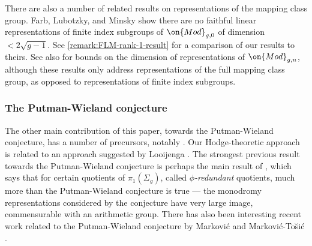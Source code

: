 There are also a number of related results on representations of the mapping class group.
Farb, Lubotzky, and Minsky \cite[Theorem 1.6]{farbLM:rank-1-phenomena} show there are no faithful linear
representations of finite index subgroups of $\on{Mod}_{g,0}$ of dimension $< 2 \sqrt{g-1}$. See \autoref{remark:FLM-rank-1-result} for a comparison of our results to theirs.
See also
\cite{franksH:triviality,korkmaz:low-dimensional-linear-representations,funar:two-questions,kielak-pierro}
for bounds on the dimension of representations of
$\on{Mod}_{g,n}$, although these results only address representations of the full mapping
class group, as opposed to representations of finite index subgroups.



\subsubsection{The Putman-Wieland conjecture} The other main contribution of
\label{subsubsection:prior-putman-wieland}
this paper, towards the Putman-Wieland conjecture, has a number of precursors,
notably \cite{looijenga:prym-representations,grunewald2015arithmetic,looijenga2021arithmetic}.
Our Hodge-theoretic approach is related to an approach suggested by Looijenga \cite{looiejenga:AG}.
The strongest previous result towards the Putman-Wieland conjecture is perhaps
the main result of \cite{grunewald2015arithmetic}, which says that for certain quotients of $\pi_1(\Sigma_g)$,
called \emph{$\phi$-redundant} quotients,
much more than the Putman-Wieland conjecture is true --- the monodromy representations considered by the conjecture have very large image, commensurable with an arithmetic group. There has also been interesting recent work related to the Putman-Wieland conjecture by Markovi\'c and Markovi\'c-To\u{s}i\'c \cite{markovic,markovic2}.

